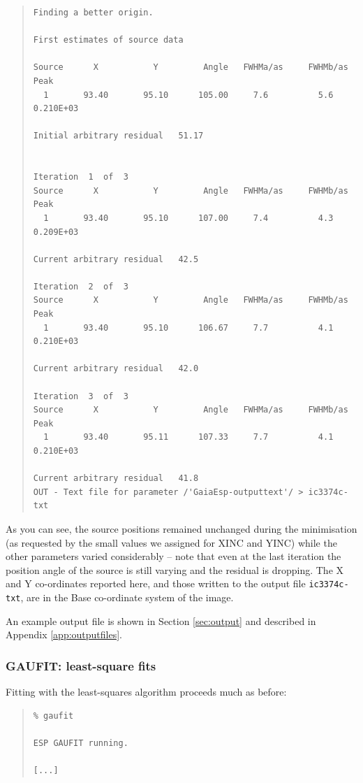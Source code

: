 \documentclass[twoside,11pt]{article}
\newenvironment{myquote}{\begin{quote}\begin{small}}{\end{small}\end{quote}}
\begin{document}
\begin{myquote}
\begin{verbatim}
Finding a better origin.

First estimates of source data

Source      X           Y         Angle   FWHMa/as     FWHMb/as         Peak
  1       93.40       95.10      105.00     7.6          5.6        0.210E+03

Initial arbitrary residual   51.17


Iteration  1  of  3
Source      X           Y         Angle   FWHMa/as     FWHMb/as         Peak
  1       93.40       95.10      107.00     7.4          4.3        0.209E+03

Current arbitrary residual   42.5

Iteration  2  of  3
Source      X           Y         Angle   FWHMa/as     FWHMb/as         Peak
  1       93.40       95.10      106.67     7.7          4.1        0.210E+03

Current arbitrary residual   42.0

Iteration  3  of  3
Source      X           Y         Angle   FWHMa/as     FWHMb/as         Peak
  1       93.40       95.11      107.33     7.7          4.1        0.210E+03

Current arbitrary residual   41.8
OUT - Text file for parameter /'GaiaEsp-outputtext'/ > ic3374c-txt
\end{verbatim}
\end{myquote}

As you can see, the source positions remained unchanged during the minimisation
(as requested by the small values we assigned for XINC and YINC) while
the other parameters varied considerably -- note that even at the last 
iteration the position angle of the source is still varying and the
residual is dropping. 
The X and Y co-ordinates reported here,
and those written to the output file {\tt ic3374c-txt}, 
are in the Base co-ordinate system of the image.

An example output file is shown in Section \ref{sec:output}
and described in Appendix \ref{app:outputfiles}.

\subsubsection{GAUFIT: least-square fits}

Fitting with the least-squares algorithm proceeds much as before:

\begin{myquote}
\begin{verbatim}
% gaufit

ESP GAUFIT running.

[...]
\end{verbatim}
\end{myquote}
\end{document}
